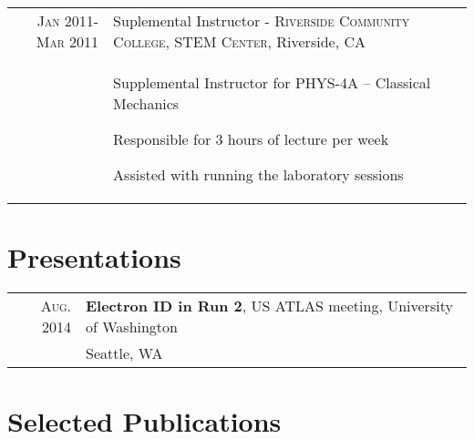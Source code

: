 \documentclass[a4paper,10pt]{article} %
\begin{document}
\begin{longtable}{r|p{11cm}}

\textsc{Jan 2011-Mar 2011} & Suplemental Instructor - \textsc{Riverside Community College, STEM Center}, Riverside, CA \emph{}\\
		& \begin{itemize}
			\footnotesize{
				\item Supplemental Instructor for PHYS-4A – Classical Mechanics
				\item Responsible for 3 hours of lecture per week
   				\item Assisted with running the laboratory sessions
			}
          \end{itemize} \\
\end{longtable}


\section{Presentations}

\begin{tabular}{rl}
\textsc{Aug.} 2014  & \textbf{Electron ID in Run 2}, US ATLAS meeting, University of Washington \\
                    &  Seattle, WA \\
\end{tabular}
\vspace{3mm}



\section{Selected Publications}
\end{document}
